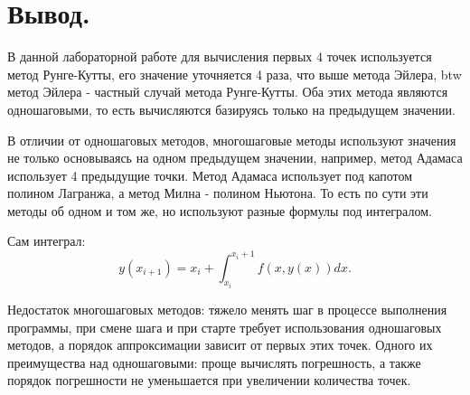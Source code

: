 \documentclass[11pt, a4paper]{article}
\begin{document}
\section{Вывод.}

В данной лабораторной работе для вычисления первых 4 точек используется метод Рунге-Кутты, его
значение уточняется 4 раза, что выше метода Эйлера, btw метод Эйлера - частный случай метода
Рунге-Кутты. Оба этих метода являются одношаговыми, то есть вычисляются базируясь только на
предыдущем значении.

\medskip\noindent
В отличии от одношаговых методов, многошаговые методы используют значения не только основываясь на
одном предыдущем значении, например, метод Адамаса использует 4 предыдущие точки. Метод Адамаса использует под
капотом полином Лагранжа, а метод Милна - полином Ньютона. То есть по сути эти методы об одном и том
же, но используют разные формулы под интегралом.

\smallskip \noindent
Сам интеграл: \[
y(x_{i + 1}) = x_i + \int_{x_i}^{x_i + 1} f(x, y(x)) dx
.\] 

\medskip\noindent
Недостаток многошаговых методов: тяжело менять шаг в процессе выполнения программы, при смене шага
и при старте требует использования одношаговых методов, а порядок аппроксимации зависит от первых
этих точек. Одного их преимущества над одношаговыми: проще вычислять погрешность, а также порядок
погрешности не уменьшается при увеличении количества точек.
\end{document}
